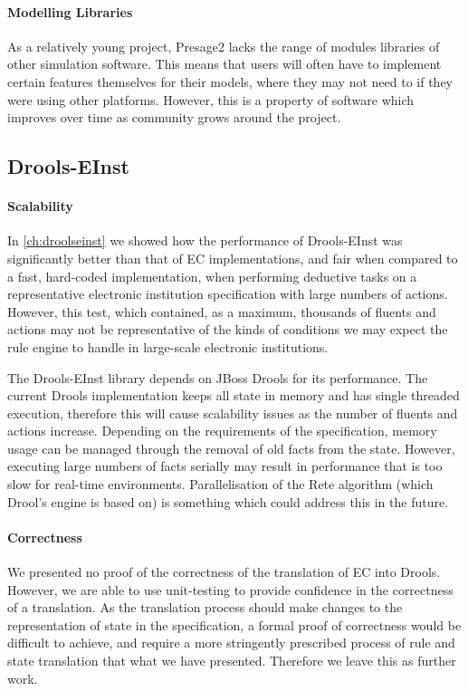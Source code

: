 \paragraph{Modelling Libraries} As a relatively young project, Presage2 lacks
the range of modules libraries of other simulation software. This means that
users will often have to implement certain features themselves for their
models, where they may not need to if they were using other platforms.
However, this is a property of software which improves over time as community
grows around the project.

\subsection{Drools-EInst}

\paragraph{Scalability}

In \autoref{ch:droolseinst} we showed how the performance of Drools-EInst was
significantly better than that of \ac{EC} implementations, and fair when
compared to a fast, hard-coded implementation, when performing deductive tasks
on a representative electronic institution specification with large numbers of
actions. However, this test, which contained, as a maximum, thousands of
fluents and actions may not be representative of the kinds of conditions we
may expect the rule engine to handle in large-scale electronic institutions.

The Drools-EInst library depends on JBoss Drools for its performance. The
current Drools implementation keeps all state in memory and has single
threaded execution, therefore this will cause scalability issues as the number
of fluents and actions increase. Depending on the requirements of the
specification, memory usage can be managed through the removal of old facts
from the state. However, executing large numbers of facts serially may result
in performance that is too slow for real-time environments. Parallelisation of
the Rete algorithm (which Drool's engine is based on) is something which could
address this in the future.

\paragraph{Correctness} We presented no proof of the correctness of the
translation of \ac{EC} into Drools. However, we are able to use unit-testing
to provide confidence in the correctness of a translation. As the translation
process should make changes to the representation of state in the
specification, a formal proof of correctness would be difficult to achieve,
and require a more stringently prescribed process of rule and state
translation that what we have presented. Therefore we leave this as further
work.


